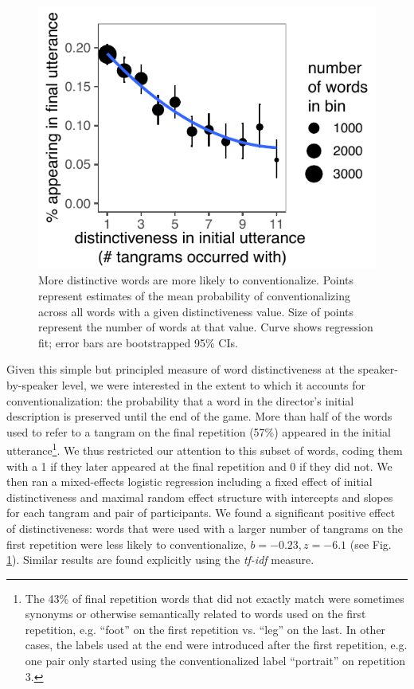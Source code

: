 \documentclass[alpha-refs]{wiley-article}
\begin{document}
\begin{figure}[t!]
\centering
\includegraphics[scale=.85]{distinctiveness.pdf}
\caption{More distinctive words are more likely to conventionalize. Points represent estimates of the mean probability of conventionalizing across all words with a given distinctiveness value. Size of points represent the number of words at that value. Curve shows regression fit; error bars are bootstrapped 95\% CIs.}
\label{fig:distinct}
\end{figure}
%
Given this simple but principled measure of word distinctiveness at the speaker-by-speaker level, we were interested in the extent to which it accounts for conventionalization: the probability that a word in the director's initial description is preserved until the end of the game. 
More than half of the words used to refer to a tangram on the final repetition (57\%) appeared in the initial utterance\footnote{The 43\% of final repetition words that did not exactly match were sometimes synonyms or otherwise semantically related to words used on the first repetition, e.g. ``foot'' on the first repetition vs. ``leg'' on the last. In other cases, the labels used at the end were introduced after the first repetition, e.g. one pair only started using the conventionalized label ``portrait'' on repetition 3.}.
We thus restricted our attention to this subset of words, coding them with a 1 if they later appeared at the final repetition and 0 if they did not.
We then ran a mixed-effects logistic regression including a fixed effect of initial distinctiveness and maximal random effect structure with intercepts and slopes for each tangram and pair of participants.
We found a significant positive effect of distinctiveness: words that were used with a larger number of tangrams on the first repetition were less likely to conventionalize, $b = -0.23, z = -6.1$ (see Fig. \ref{fig:distinct}). 
Similar results are found explicitly using the \emph{tf-idf} measure. 
\end{document}
